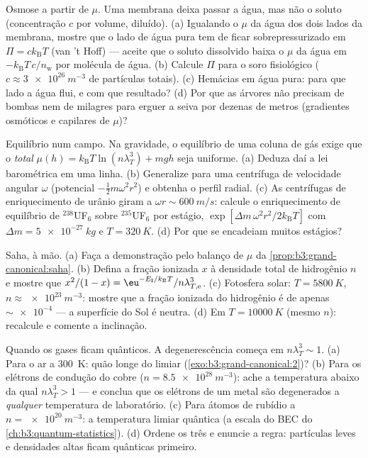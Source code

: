\begin{exercise}[$\star\star$]\label{exo:b3:grand-canonical:8}
Osmose a partir de $\mu$. Uma membrana deixa passar a água, mas não o
soluto (concentração $c$ por volume, diluído). (a) Igualando o $\mu$ da
água dos dois lados da membrana, mostre que o lado de água pura tem de
ficar sobrepressurizado em $\Pi = ck_{\text{B}}T$ (van 't Hoff) ---
aceite que o soluto dissolvido baixa o $\mu$ da água em
$-k_{\text{B}}T\,c/n_{\text{w}}$ por molécula de água. (b) Calcule
$\Pi$ para o soro fisiológico ($c \approx \qty{3e26}{m^{-3}}$
de partículas totais). (c) Hemácias em água pura: para que lado a água
flui, e com que resultado? (d) Por que as árvores não precisam de bombas
nem de milagres para erguer a seiva por dezenas de metros (gradientes
osmóticos e capilares de $\mu$)?
\end{exercise}

\begin{exercise}[$\star\star$]\label{exo:b3:grand-canonical:9}
Equilíbrio num campo. Na gravidade, o equilíbrio de uma coluna de gás
exige que o  \emph{total} $\mu(h) =
k_{\text{B}}T\ln(n\lambda_T^3) + mgh$ seja uniforme. (a) Deduza daí
a lei barométrica em uma linha. (b) Generalize para uma centrífuga
de velocidade angular $\omega$ (potencial
$-\tfrac12 m\omega^2r^2$) e obtenha o perfil radial. (c)
As centrífugas de enriquecimento de urânio giram a $\omega r \sim
\qty{600}{m/s}$: calcule o enriquecimento de equilíbrio de $^{238}$UF$_6$
sobre $^{235}$UF$_6$ por estágio, $\exp[\Delta m\,\omega^2
r^2/2k_{\text{B}}T]$ com $\Delta m = \qty{5e-27}{kg}$ e $T =
\qty{320}{K}$. (d) Por que se encadeiam muitos estágios?
\end{exercise}

\begin{exercise}[$\star\star\star$]\label{exo:b3:grand-canonical:10}
Saha, à mão. (a) Faça a demonstração pelo balanço de $\mu$ da
\cref{prop:b3:grand-canonical:saha}. (b) Defina a fração ionizada
$x$ à densidade total de hidrogênio $n$ e mostre que $x^2/(1 - x)
= \eu^{-E_{\text{I}}/k_{\text{B}}T}/n\lambda_{T,\text{e}}^3$. (c)
Fotosfera solar: $T = \qty{5800}{K}$, $n \approx
\qty{e23}{m^{-3}}$: mostre que a fração ionizada do hidrogênio é de
apenas $\sim\num{e-4}$ --- a superfície do Sol é neutra. (d) Em $T =
\qty{10000}{K}$ (mesmo $n$): recalcule e comente a inclinação.
\end{exercise}

\begin{exercise}[$\star\star\star$]\label{exo:b3:grand-canonical:11}
Quando os gases ficam quânticos. A degenerescência começa em $n\lambda_T^3 \sim
1$. (a) Para o ar a \qty{300}{K}: quão longe do
limiar (\cref{exo:b3:grand-canonical:2})? (b) Para os elétrons de
condução do cobre ($n = \qty{8.5e28}{m^{-3}}$): ache a temperatura
abaixo da qual $n\lambda_T^3 > 1$ --- e conclua que os elétrons de um
metal são degenerados a \emph{qualquer} temperatura de laboratório.
(c) Para átomos de rubídio a $n = \qty{e20}{m^{-3}}$: a temperatura
limiar quântica (a escala do BEC do
\cref{ch:b3:quantum-statistics}). (d) Ordene os três e enuncie a
regra: partículas leves e densidades altas ficam quânticas primeiro.
\end{exercise}

